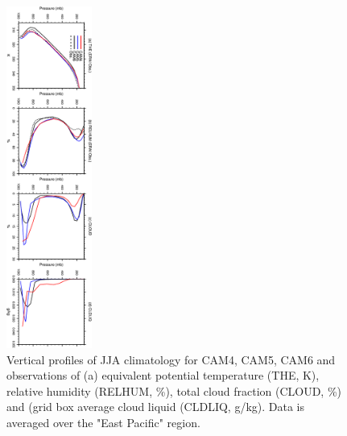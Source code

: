 \clearpage
\begin{figure}[t]
  \begin{center}
    \includegraphics[width=0.25\textwidth,angle=90.]{./figs/f_vprof_epac_JJA.pdf}
  \end{center}
  \caption{Vertical profiles of JJA climatology for CAM4, CAM5, CAM6 and observations of (a) equivalent potential temperature (THE, K), relative humidity (RELHUM, \%), total cloud fraction (CLOUD, \%) and (grid box average cloud liquid (CLDLIQ, g/kg). Data is averaged over the "East Pacific" region.} 
\label{f_vprof_epac_JJA}
\end{figure} 


